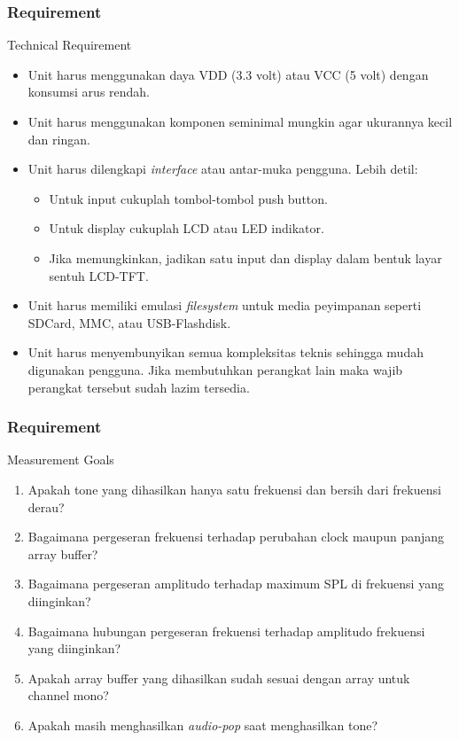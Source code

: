 \documentclass[table,dvipsnames,10pt]{beamer}
\begin{document}
	\begin{frame}
	\frametitle{Requirement}
	\begin{exampleblock}{Technical Requirement}
		\begin{itemize}
			\item Unit harus menggunakan daya VDD (3.3 volt) atau VCC (5 volt) dengan konsumsi arus rendah.
			
			\item Unit harus menggunakan komponen seminimal mungkin agar ukurannya kecil dan ringan.
			
			\item Unit harus dilengkapi \textit{interface} atau antar-muka pengguna.
			Lebih detil:
			\begin{itemize}
				\item Untuk input cukuplah tombol-tombol push button.
				\item Untuk display cukuplah LCD atau LED indikator.
				\item Jika memungkinkan, jadikan satu input dan display
				dalam bentuk layar sentuh LCD-TFT.
			\end{itemize}
			\item Unit harus memiliki emulasi \textit{filesystem} untuk media peyimpanan seperti
			SDCard, MMC, atau USB-Flashdisk.
			
			\item Unit harus menyembunyikan semua kompleksitas teknis sehingga mudah digunakan pengguna.
			Jika membutuhkan perangkat lain maka wajib perangkat tersebut sudah lazim tersedia.
		\end{itemize}
	\end{exampleblock}
	\end{frame}

	\begin{frame}
	\frametitle{Requirement}
	\begin{exampleblock}{Measurement Goals}
		\begin{enumerate}
			\item Apakah tone yang dihasilkan hanya satu frekuensi dan bersih dari frekuensi derau?
			\item Bagaimana pergeseran frekuensi terhadap perubahan clock maupun panjang array buffer?
			\item Bagaimana pergeseran amplitudo terhadap maximum SPL di frekuensi yang diinginkan?
			\item Bagaimana hubungan pergeseran frekuensi terhadap amplitudo frekuensi yang diinginkan?
			\item Apakah array buffer yang dihasilkan sudah sesuai dengan array untuk channel mono?
			\item Apakah masih menghasilkan \textit{audio-pop} saat menghasilkan tone?
		\end{enumerate}
	\end{exampleblock}
	\end{frame}
\end{document}
